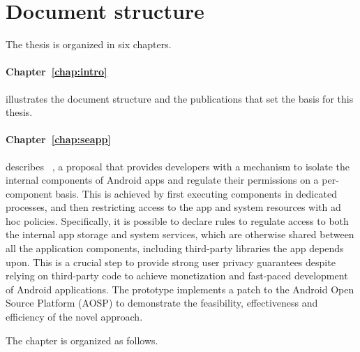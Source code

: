 \section{Document structure}

The thesis is organized in six chapters.

\paragraph*{Chapter~\ref{chap:intro}} illustrates the document
structure and the publications that set the basis for this thesis.

\paragraph*{Chapter~\ref{chap:seapp}} describes \seapp~\cite{seapp}, a
proposal that provides developers with a mechanism to isolate the
internal components of Android apps and regulate their permissions on
a per-component basis. This is achieved by first executing components
in dedicated processes, and then restricting access to the app and
system resources with ad hoc \sel policies. Specifically, it is
possible to declare rules to regulate access to both the internal app
storage and system services, which are otherwise shared between all
the application components, including third-party libraries the app
depends upon. This is a crucial step to provide strong user privacy
guarantees despite relying on third-party code to achieve monetization
and fast-paced development of Android applications. The prototype
implements a patch to the Android Open Source Platform (AOSP) to
demonstrate the feasibility, effectiveness and efficiency of the novel
approach.

\smallskip
\noindent The chapter is organized as follows.

